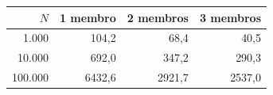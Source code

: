 \begin{tabular}{rrrr}
\toprule
$N$ & 1 membro & 2 membros & 3 membros \\
\midrule
1.000 & 104,2 & 68,4 & 40,5 \\
10.000 & 692,0 & 347,2 & 290,3 \\
100.000 & 6432,6 & 2921,7 & 2537,0 \\
\bottomrule
\end{tabular}
